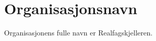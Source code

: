 \section{Organisasjonsnavn} \label{organisasjonsnavn}

Organisasjonens fulle navn er Realfagskjelleren.